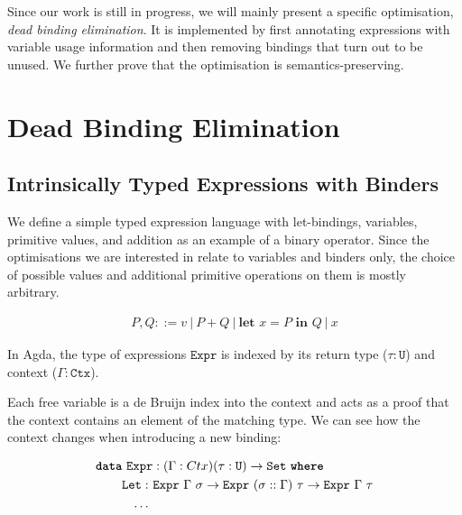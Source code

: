 \documentclass[sigplan,nonacm,screen,review,timestamp]{acmart}
\newcommand{\Todo}[1]{\todo[inline,backgroundcolor=orange!30]{TODO: #1}}
\newcommand{\I}[1]{\texttt{#1}\xspace}
\newcommand{\K}[1]{\textbf{\texttt{#1}}\xspace}
\begin{document}


Since our work is still in progress,
we will mainly present a specific optimisation, \emph{dead binding elimination}.
It is implemented by first annotating expressions with variable usage information
and then removing bindings that turn out to be unused.
We further prove that the optimisation is semantics-preserving.


\section{Dead Binding Elimination}

\subsection{Intrinsically Typed Expressions with Binders}

We define a simple typed expression language with let-bindings,
variables, primitive values, and addition as an example of a binary operator.
Since the optimisations we are interested in relate to variables and binders only,
the choice of possible values and additional primitive operations on them is mostly arbitrary.

\begin{align*}
  P, Q ::= v
  \ \big|\  P + Q
  \ \big|\  \textbf{let } x = P \textbf{ in } Q
  \ \big|\  x
\end{align*}

In Agda, the type of expressions $\I{Expr}$ is indexed by its return type ($\tau : \I{U}$)
and context ($\Gamma : \I{Ctx}$).

Each free variable is a de Bruijn index into the context and acts as a proof that
the context contains an element of the matching type.
We can see how the context changes when introducing a new binding:

\begin{align*}
  \K{data}\ \I{Expr}& : (\Gamma : Ctx) (\tau : \I{U}) \to \I{Set}\ \K{where} \\
  \I{Let}
    :\ &\I{Expr}\ \Gamma\ \sigma \to
        \I{Expr}\ (\sigma :: \Gamma)\ \tau \to
        \I{Expr}\ \Gamma\ \tau  \\
    \ldots\ &
\end{align*}
\end{document}
